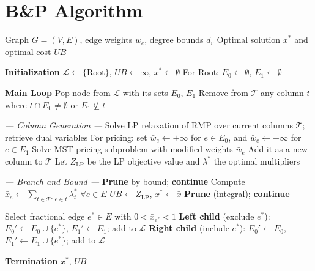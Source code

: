 \documentclass[12pt]{article}
\begin{document}
\section{B\&P Algorithm}
\label{BP}
\begin{algorithm}
\caption{Branch-and-Price for Degree-Constrained Minimum Spanning Tree}
\begin{algorithmic}[1]
\footnotesize

\Require Graph $G = (V, E)$, edge weights $w_e$, degree bounds $d_v$
\Ensure Optimal solution $x^*$ and optimal cost $UB$

\Statex
\Statex \textbf{Initialization}
\State $\mathcal{L} \gets \{\text{Root}\}$, \quad $UB \gets \infty$, \quad $x^* \gets \emptyset$
\State For Root: $E_0 \gets \emptyset$, $E_1 \gets \emptyset$

\Statex
\Statex \textbf{Main Loop}
    \State Pop node from $\mathcal{L}$ with its sets $E_0$, $E_1$
    \State Remove from $\mathcal{T}$ any column $t$ where $t \cap E_0 \neq \emptyset$ or $E_1 \not\subseteq t$

\Statex
    \Statex \quad \textit{--- Column Generation ---}
    \Repeat
        \State Solve LP relaxation of RMP over current columns $\mathcal{T}$; retrieve dual variables
        \State For pricing: set $\bar{w}_e \gets +\infty$ for $e \in E_0$, and $\bar{w}_e \gets -\infty$ for $e \in E_1$
        \State Solve MST pricing subproblem with modified weights $\bar{w}_e$
            \State Add it as a new column to $\mathcal{T}$
        \EndIf
    \State Let $Z_{\text{LP}}$ be the LP objective value and $\lambda^*$ the optimal multipliers

\Statex
    \Statex \quad \textit{--- Branch and Bound ---}
        \State \textbf{Prune} by bound; \textbf{continue}
    \EndIf
    \State Compute $\bar{x}_e \gets \sum_{t \in \mathcal{T}:\, e \in t} \lambda_t^*$ \quad $\forall e \in E$
            \State $UB \gets Z_{\text{LP}}$, \quad $x^* \gets \bar{x}$
        \EndIf
        \State \textbf{Prune} (integral); \textbf{continue}
    \EndIf

    \State Select fractional edge $e^* \in E$ with $0 < \bar{x}_{e^*} < 1$
    \State \textbf{Left child} (exclude $e^*$): \enspace $E_0' \gets E_0 \cup \{e^*\}$, \enspace $E_1' \gets E_1$; \enspace add to $\mathcal{L}$
    \State \textbf{Right child} (include $e^*$): \enspace $E_0' \gets E_0$, \enspace $E_1' \gets E_1 \cup \{e^*\}$; \enspace add to $\mathcal{L}$

\EndWhile 
\Statex \textbf{Termination}
\State \Return $x^*$, $UB$

\end{algorithmic}
\end{algorithm}
\end{document}
